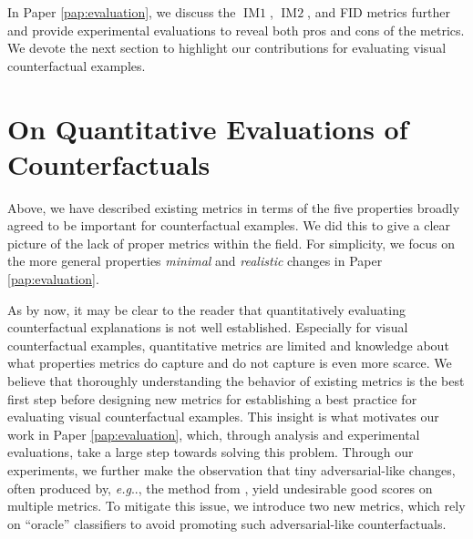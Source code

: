 \documentclass[11pt,a4paper,twoside,openright,final]{memoir}
\makeatletter
\DeclareRobustCommand\onedot{\futurelet\@let@token\@onedot}
\def\@onedot{\ifx\@let@token.\else.\null\fi\xspace}
\def\eg{\emph{e.g}\onedot} \def\Eg{\emph{E.g}\onedot}
\newcommand\contribution[1]{\hspace{0.5em}\hyperref[#1]{\ding{81}}}
\newcommand*{\paperref}[1]{Paper \hyperref[#1]{\ref{#1}}}
\makeatother
\begin{document}
In \paperref{pap:evaluation}, we discuss the $\operatorname{IM1}$, $\operatorname{IM2}$, and FID metrics further and provide experimental evaluations to reveal both pros and cons of the metrics.
We devote the next section to highlight our contributions for evaluating visual counterfactual examples. 

\section{On Quantitative Evaluations of Counterfactuals\contribution{pap:evaluation}}\label{sec:evaluation-paper}

Above, we have described existing metrics in terms of the five properties broadly agreed to be important for counterfactual examples.
We did this to give a clear picture of the lack of proper metrics within the field. 
For simplicity, we focus on the more general properties \emph{minimal} and \emph{realistic} changes in \paperref{pap:evaluation}. 

As by now, it may be clear to the reader that quantitatively evaluating counterfactual explanations is not well established.
Especially for visual counterfactual examples, quantitative metrics are limited and knowledge about what properties metrics do capture and do not capture is even more scarce.
We believe that thoroughly understanding the behavior of existing metrics is the best first step before designing new metrics for establishing a best practice for evaluating visual counterfactual examples.
This insight is what motivates our work in \paperref{pap:evaluation}, which, through analysis and experimental evaluations, take a large step towards solving this problem.
Through our experiments, we further make the observation that tiny adversarial-like changes, often produced by, \eg, the method from \cite{Wachter2017}, yield undesirable good scores on multiple metrics.
To mitigate this issue, we introduce two new metrics, which rely on ``oracle'' classifiers to avoid promoting such adversarial-like counterfactuals.
\end{document}
